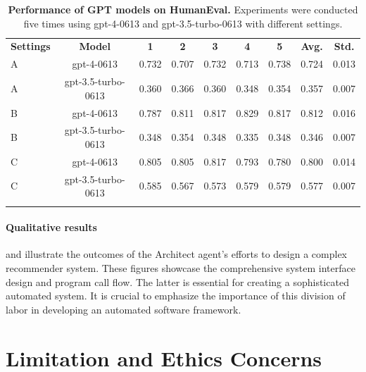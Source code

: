 \begin{table}[htb]
  \centering
      \caption{\textbf{Performance of GPT models on HumanEval.}{
      Experiments were conducted five times using gpt-4-0613 and gpt-3.5-turbo-0613 with different settings.
      }}
      \label{tab:performance_on_gpt}
\renewcommand\tabcolsep{7.2pt}
\renewcommand\arraystretch{1.2}
  \begin{tabular}{l|cccccccc} %
\Xhline{1.5pt}
\rowcolor{paleaqua} 
\textbf{Settings} & \textbf{Model} & \textbf{1} & \textbf{2}& \textbf{3} & \textbf{4} & \textbf{5} & \textbf{Avg.} & \textbf{Std.} \\
\Xhline{1.5pt}
A&gpt-4-0613&0.732&0.707&0.732 &0.713 & 0.738 & 0.724 & 0.013\\
\rowcolor{gray!20} A &gpt-3.5-turbo-0613&0.360&0.366&0.360& 0.348 & 0.354 & 0.357 & 0.007\\
B&gpt-4-0613&0.787&0.811&0.817&0.829& 0.817 & 0.812 & 0.016 \\
\rowcolor{gray!20} B &gpt-3.5-turbo-0613&0.348&0.354&0.348&0.335 & 0.348& 0.346& 0.007\\
C&gpt-4-0613&0.805&0.805&0.817&0.793&0.780 &0.800 & 0.014 \\
\rowcolor{gray!20} C &gpt-3.5-turbo-0613&0.585&0.567&0.573&0.579&0.579 & 0.577& 0.007 \\
\Xhline{1.5pt}
\end{tabular}

\end{table}


\paragraph{Qualitative results}
 and  illustrate the outcomes of the Architect agent's efforts to design a complex recommender system.
%
These figures showcase the comprehensive system interface design and program call flow. 
%
The latter is essential for creating a sophisticated automated system. It is crucial to emphasize the importance of this division of labor in developing an automated software framework.

\section{Limitation and Ethics Concerns}

